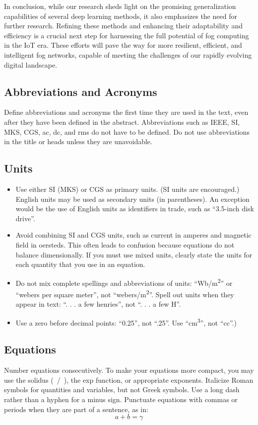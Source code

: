 \documentclass[conference]{IEEEtran}
\begin{document}
In conclusion, while our research sheds light on the promising generalization capabilities of several deep learning methods, it also emphasizes the need for further research. Refining these methods and enhancing their adaptability and efficiency is a crucial next step for harnessing the full potential of fog computing in the IoT era. These efforts will pave the way for more resilient, efficient, and intelligent fog networks, capable of meeting the challenges of our rapidly evolving digital landscape.

\subsection{Abbreviations and Acronyms}\label{AA}
Define abbreviations and acronyms the first time they are used in the text, 
even after they have been defined in the abstract. Abbreviations such as 
IEEE, SI, MKS, CGS, ac, dc, and rms do not have to be defined. Do not use 
abbreviations in the title or heads unless they are unavoidable.

\subsection{Units}
\begin{itemize}
\item Use either SI (MKS) or CGS as primary units. (SI units are encouraged.) English units may be used as secondary units (in parentheses). An exception would be the use of English units as identifiers in trade, such as ``3.5-inch disk drive''.
\item Avoid combining SI and CGS units, such as current in amperes and magnetic field in oersteds. This often leads to confusion because equations do not balance dimensionally. If you must use mixed units, clearly state the units for each quantity that you use in an equation.
\item Do not mix complete spellings and abbreviations of units: ``Wb/m\textsuperscript{2}'' or ``webers per square meter'', not ``webers/m\textsuperscript{2}''. Spell out units when they appear in text: ``. . . a few henries'', not ``. . . a few H''.
\item Use a zero before decimal points: ``0.25'', not ``.25''. Use ``cm\textsuperscript{3}'', not ``cc''.)
\end{itemize}

\subsection{Equations}
Number equations consecutively. To make your 
equations more compact, you may use the solidus (~/~), the exp function, or 
appropriate exponents. Italicize Roman symbols for quantities and variables, 
but not Greek symbols. Use a long dash rather than a hyphen for a minus 
sign. Punctuate equations with commas or periods when they are part of a 
sentence, as in:
\begin{equation}
a+b=\gamma\label{eq}
\end{equation}
\end{document}
